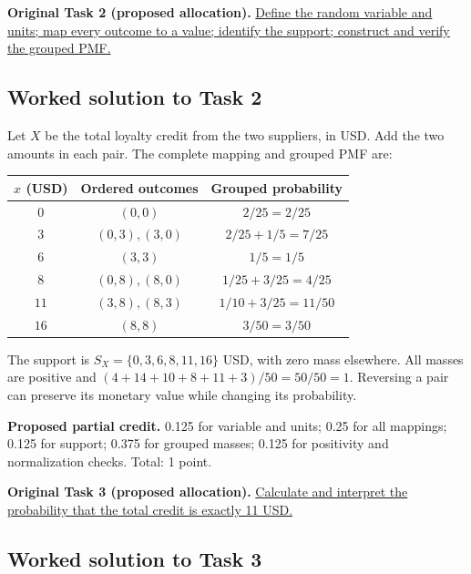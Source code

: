 \par\vspace{3mm}\secInicio[][sec:q2]

\textbf{Original Task 2 (proposed allocation).} \hyperref[sol:q2t2]{Define the random variable and units; map every outcome to a value; identify the support; construct and verify the grouped PMF.} 


\subsection*{Worked solution to Task 2 }
\label{sol:q2t2}

Let $X$ be the total loyalty credit from the two suppliers, in USD. Add the two amounts in each pair. The complete mapping and grouped PMF are:

\begin{center}
\begin{tabular}{ccc}\toprule
$x$ (USD) & Ordered outcomes & Grouped probability\\\midrule
$0$ & $(0,0)$ & $2/25=2/25$\\
$3$ & $(0,3),(3,0)$ & $2/25+1/5=7/25$\\
$6$ & $(3,3)$ & $1/5=1/5$\\
$8$ & $(0,8),(8,0)$ & $1/25+3/25=4/25$\\
$11$ & $(3,8),(8,3)$ & $1/10+3/25=11/50$\\
$16$ & $(8,8)$ & $3/50=3/50$\\
\bottomrule\end{tabular}
\end{center}


The support is $S_X=\{0,3,6,8,11,16\}$ USD, with zero mass elsewhere. All masses are positive and $(4+14+10+8+11+3)/50=50/50=1$. Reversing a pair can preserve its monetary value while changing its probability.

\textbf{Proposed partial credit.} 0.125 for variable and units; 0.25 for all mappings; 0.125 for support; 0.375 for grouped masses; 0.125 for positivity and normalization checks. Total: 1 point.

\par\vspace{3mm}\secInicio[][sec:q2]

\textbf{Original Task 3 (proposed allocation).} \hyperref[sol:q2t3]{Calculate and interpret the probability that the total credit is exactly 11 USD.} 


\subsection*{Worked solution to Task 3 }
\label{sol:q2t3}

